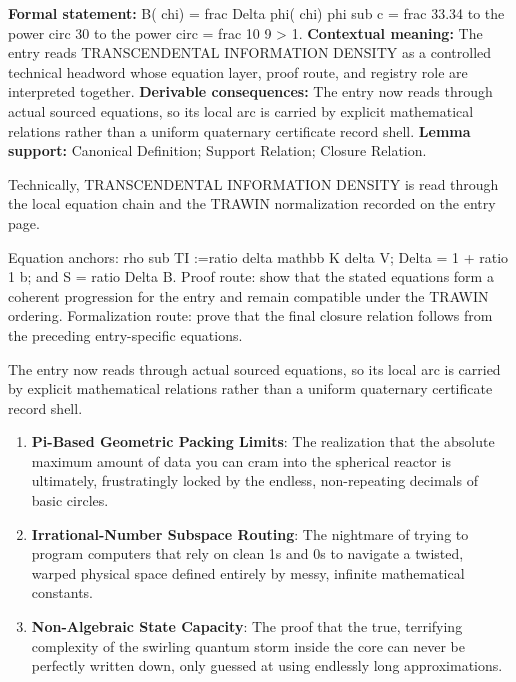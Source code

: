 \begingroup\footnotesize\setlength{\emergencystretch}{3em}\sloppy
\textbf{Formal statement:} B( chi) = frac Delta phi( chi) phi sub c = frac 33.34 to the power circ 30 to the power circ = frac 10 9 > 1. \textbf{Contextual meaning:} The entry reads TRANSCENDENTAL INFORMATION DENSITY as a controlled technical headword whose equation layer, proof route, and registry role are interpreted together. \textbf{Derivable consequences:} The entry now reads through actual sourced equations, so its local arc is carried by explicit mathematical relations rather than a uniform quaternary certificate record shell. \textbf{Lemma support:} Canonical Definition; Support Relation; Closure Relation.\par
\endgroup

Technically, TRANSCENDENTAL INFORMATION DENSITY is read through the local equation chain and the TRAWIN normalization recorded on the entry page.

Equation anchors: rho sub TI :=ratio delta mathbb K delta V; Delta = 1 + ratio 1 b; and S = ratio Delta B. Proof route: show that the stated equations form a coherent progression for the entry and remain compatible under the TRAWIN ordering. Formalization route: prove that the final closure relation follows from the preceding entry-specific equations.

The entry now reads through actual sourced equations, so its local arc is carried by explicit mathematical relations rather than a uniform quaternary certificate record shell.
\endgroup

\begin{enumerate}[leftmargin=1.6em,itemsep=6pt,topsep=4pt]
\item \textbf{Pi-Based Geometric Packing Limits}: The realization that the absolute maximum amount of data you can cram into the spherical reactor is ultimately, frustratingly locked by the endless, non-repeating decimals of basic circles.
\item \textbf{Irrational-Number Subspace Routing}: The nightmare of trying to program computers that rely on clean 1s and 0s to navigate a twisted, warped physical space defined entirely by messy, infinite mathematical constants.
\item \textbf{Non-Algebraic State Capacity}: The proof that the true, terrifying complexity of the swirling quantum storm inside the core can never be perfectly written down, only guessed at using endlessly long approximations.
\end{enumerate}

